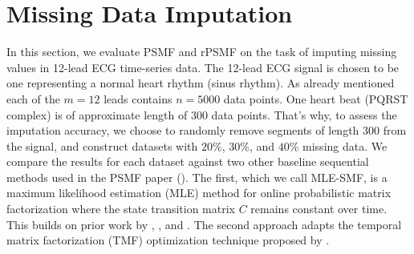 \documentclass{mldsmsc}
\begin{document}




\section{Missing Data Imputation}\label{sec:exp1}

In this section, we evaluate PSMF and rPSMF on the task of imputing missing values in 12-lead ECG time-series data. The 12-lead ECG signal is chosen to be one representing a normal heart rhythm (sinus rhythm). As already mentioned each of the $m = 12$ leads contains $n = 5000$ data points. One heart beat (PQRST complex) is of approximate length of $300$ data points. That's why, to assess the imputation accuracy, we choose to randomly remove segments of length $300$ from the signal, and construct datasets with $20\%$, $30\%$, and $40\%$ missing data. We compare the results for each dataset against two other baseline sequential methods used in the PSMF paper (\cite{akyildiz2021probabilistic}). The first, which we call MLE-SMF, is a maximum likelihood estimation (MLE) method for online probabilistic matrix factorization where the state transition matrix $C$ remains constant over time. This builds on prior work by \cite{YILDIRIM2012494}, \cite{6288274}, and \cite{6638240}. The second approach adapts the temporal matrix factorization (TMF) optimization technique proposed by \cite{NIPS2016_85422afb}. \newline
\end{document}
